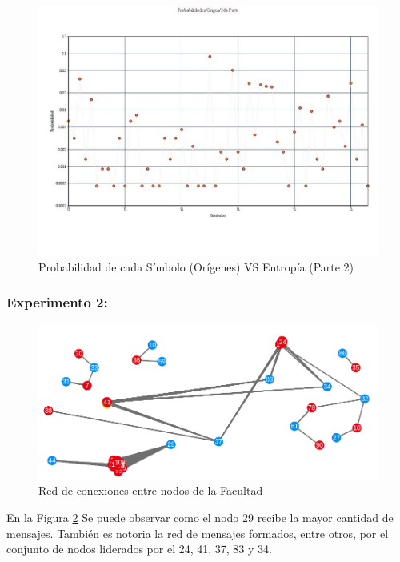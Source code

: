 \begin{figure}[H]
  \centering
    \includegraphics[scale=0.45]{imagenes/graficos/Probabilidades/02origen2daParte.jpg}
  \caption{Probabilidad de cada Símbolo (Orígenes) VS Entropía (Parte 2)}
  \label{fig:8}
\end{figure}

\subsubsection{Experimento 2:}

\begin{figure}[H]
  \centering
    \includegraphics[scale=0.6]{imagenes/graficos/grafos/facultad.png}
  \caption{Red de conexiones entre nodos de la Facultad}
  \label{fig:9}
\end{figure}

En la Figura \ref{fig:9} Se puede observar como el nodo 29 recibe la mayor cantidad de mensajes. También es notoria la red de mensajes formados, entre otros, por el conjunto de nodos liderados por el 24, 41, 37, 83 y 34.

